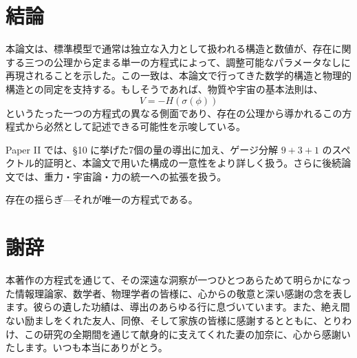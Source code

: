 \documentclass[fontsize=11pt,paper=a4,lualatex]{jlreq}
\begin{document}
\section{結論}\label{ux7d50ux8ad6}

本論文は、標準模型で通常は独立な入力として扱われる構造と数値が、存在に関する三つの公理から定まる単一の方程式によって、調整可能なパラメータなしに再現されることを示した。この一致は、本論文で行ってきた数学的構造と物理的構造との同定を支持する。もしそうであれば、物質や宇宙の基本法則は、
\[V = -H(\sigma(\phi))\]
というたった一つの方程式の異なる側面であり、存在の公理から導かれるこの方程式から必然として記述できる可能性を示唆している。

Paper II \cite{paper2}
では、§10 に挙げた7個の量の導出に加え、ゲージ分解 $9{+}3{+}1$ のスペクトル的証明と、本論文で用いた構成の一意性をより詳しく扱う。さらに後続論文では、\mbox{重力・宇宙論・力の統一}への拡張を扱う。

\medskip
\noindent
存在の揺らぎ---それが唯一の方程式である。

\section*{謝辞}\label{ux8b1dux8f9e}

本著作の方程式を通じて、その深遠な洞察が一つひとつあらためて明らかになった情報理論家、数学者、物理学者の皆様に、心からの敬意と深い感謝の念を表します。彼らの遺した功績は、導出のあらゆる行に息づいています。また、絶え間ない励ましをくれた友人、同僚、そして家族の皆様に感謝するとともに、とりわけ、この研究の全期間を通じて献身的に支えてくれた妻の加奈に、心から感謝いたします。いつも本当にありがとう。

\small
\end{document}

